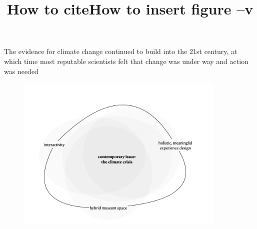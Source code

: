 

\title{How to cite}
The evidence for climate change continued to build into the 21st century, at which time most reputable scientists felt that change was under way and action was needed \cite{hebda_museums_2007}

\title{How to insert figure --v    }

\begin{figure}[h]
\includegraphics[width=10cm]{pictures/problem_sphere.png}
\centering 
\end{figure}

